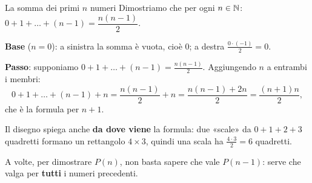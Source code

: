 \begin{esempio}{La somma dei primi $n$ numeri}
    Dimostriamo che per ogni $n \in \mathbb{N}$: \quad $0 + 1 + \dots + (n - 1) = \dfrac{n(n - 1)}{2}$.
    \begin{passi}
        \item \textbf{Base} ($n = 0$): a sinistra la somma è vuota, cioè $0$; a destra $\frac{0 \cdot (-1)}{2} = 0$.
        \item \textbf{Passo}: supponiamo $0 + 1 + \dots + (n - 1) = \frac{n(n - 1)}{2}$. Aggiungendo $n$ a entrambi i membri:
              \[ 0 + 1 + \dots + (n - 1) + n = \frac{n(n - 1)}{2} + n = \frac{n(n - 1) + 2n}{2} = \frac{(n + 1)n}{2}, \]
              che è la formula per $n + 1$.
    \end{passi}
    Il disegno spiega anche \textbf{da dove viene} la formula: due «scale» da $0 + 1 + 2 + 3$ quadretti formano un rettangolo
    $4 \times 3$, quindi una scala ha $\frac{4 \cdot 3}{2} = 6$ quadretti.
    \begin{center}
    \end{center}
\end{esempio}

A volte, per dimostrare $P(n)$, non basta sapere che vale $P(n - 1)$: serve che valga per \textbf{tutti} i numeri precedenti.

